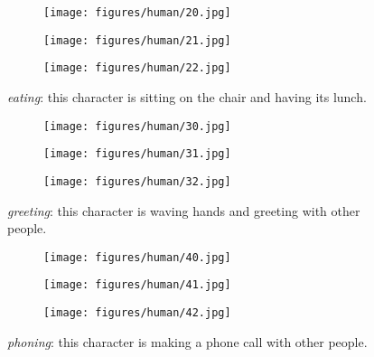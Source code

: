 \documentclass[runningheads]{llncs}
\begin{document}
\begin{figure}[h!]
  \centering
  \begin{subfigure}{0.99\textwidth}
    \texttt{[image: figures/human/20.jpg]}
\end{subfigure}
  \begin{subfigure}{0.99\textwidth}
    \texttt{[image: figures/human/21.jpg]}
\end{subfigure}
  \begin{subfigure}{0.99\textwidth}
    \texttt{[image: figures/human/22.jpg]}
\end{subfigure}
  \caption{\textit{eating}: this character is sitting on the chair and having its lunch.}
  \label{fig:human_2}
\end{figure}


\begin{figure}[h!]
  \centering
  \begin{subfigure}{0.99\textwidth}
    \texttt{[image: figures/human/30.jpg]}
\end{subfigure}
  \begin{subfigure}{0.99\textwidth}
    \texttt{[image: figures/human/31.jpg]}
\end{subfigure}
  \begin{subfigure}{0.99\textwidth}
    \texttt{[image: figures/human/32.jpg]}
\end{subfigure}
  \caption{\textit{greeting}: this character is waving hands and greeting with other people.}
  \label{fig:human_3}
\end{figure}
 
\begin{figure}[h!]
  \centering
  \begin{subfigure}{0.99\textwidth}
    \texttt{[image: figures/human/40.jpg]}
\end{subfigure}
  \begin{subfigure}{0.99\textwidth}
    \texttt{[image: figures/human/41.jpg]}
\end{subfigure}
  \begin{subfigure}{0.99\textwidth}
    \texttt{[image: figures/human/42.jpg]}
\end{subfigure}
  \caption{\textit{phoning}: this character is making a phone call with other people.}
  \label{fig:human_4}
\end{figure}
\end{document}

